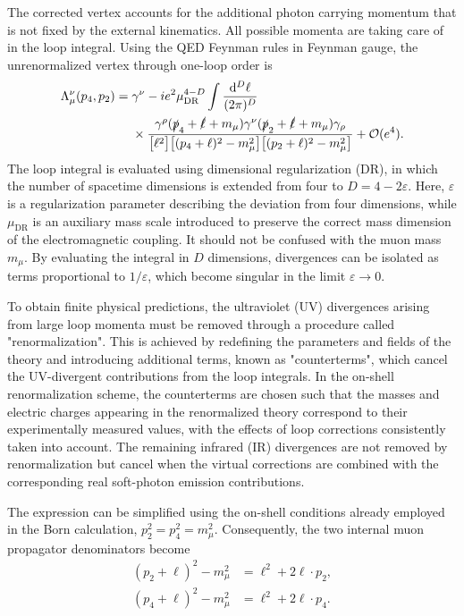 The corrected vertex accounts for the additional photon carrying momentum that is not fixed by the external kinematics. All possible momenta are taking care of in the loop integral. Using the QED Feynman rules in Feynman gauge, the unrenormalized vertex through one-loop order is
\begin{equation}
\begin{split}
  \Lambda^\nu_\mu(p_4,p_2)
  ={}&\gamma^\nu-ie^2\mu_{\mathrm{DR}}^{4-D}
  \int\frac{\mathrm{d}^{D}\ell}{(2\pi)^D}\\
  &\times\frac{\gamma^\rho(\slashed p_4+\slashed\ell+m_\mu)
  \gamma^\nu(\slashed p_2+\slashed\ell+m_\mu)\gamma_\rho}
  {\bigl[\ell^2\bigr]
   \bigl[(p_4+\ell)^2-m_\mu^2\bigr]
   \bigl[(p_2+\ell)^2-m_\mu^2\bigr]}
  +\mathcal O(e^4).
\end{split}
\label{eq:nlo_muon_vertex_integral}
\end{equation}
The loop integral is evaluated using dimensional regularization (DR), in which the number of spacetime dimensions is extended from four to \( D=4-2\varepsilon\). Here, \(\varepsilon\) is a regularization parameter describing the deviation from four dimensions, while \(\mu_{\mathrm{DR}}\) is an auxiliary mass scale introduced to preserve the correct mass dimension of the electromagnetic coupling. It should not be confused with the muon mass \(m_\mu\). By evaluating the integral in \(D\) dimensions, divergences can be isolated as terms proportional to \(1/\varepsilon\), which become singular in the limit \(\varepsilon\rightarrow 0\).

To obtain finite physical predictions, the ultraviolet (UV) divergences arising from large loop momenta must be removed through a procedure called "renormalization". This is achieved by redefining the parameters and fields of the theory and introducing additional terms, known as "counterterms", which cancel the UV-divergent contributions from the loop integrals. In the on-shell renormalization scheme, the counterterms are chosen such that the masses and electric charges appearing in the renormalized theory correspond to their experimentally measured values, with the effects of loop corrections consistently taken into account. The remaining infrared (IR) divergences are not removed by renormalization but cancel when the virtual corrections are combined with the corresponding real soft-photon emission contributions.

The expression can be simplified using the on-shell conditions already employed in the Born calculation, $p_2^2=p_4^2=m_\mu^2$. Consequently, the two internal muon propagator denominators become
\begin{align}
 (p_2+\ell)^2-m_\mu^2&=\ell^2+2\ell\cdot p_2,\\
 (p_4+\ell)^2-m_\mu^2&=\ell^2+2\ell\cdot p_4.
 \label{eq:nlo_vertex_onshell_denominators}
\end{align}

